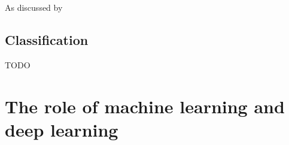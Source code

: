 As discussed by \citet{CAD_ml_dl_kbs} 









\subsection{Classification}
\label{subsec:processing_signals_general_pipeline_classification}

TODO




\section{The role of machine learning and deep learning}
\label{sec:processing_signals_ml_and_dl}





